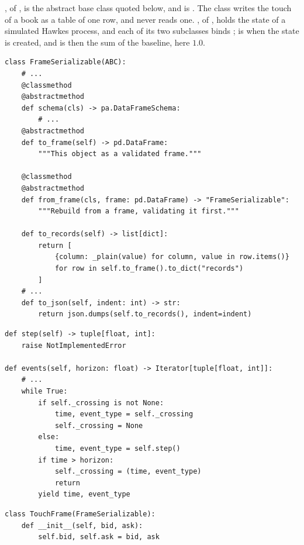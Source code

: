 \begin{question}
\label{question.abstractMethodRaisesAtInstantiation}
, of , is the abstract base class quoted below,
and  is .
The class  writes the touch of a book as a table of one row, and never reads one.
, of , holds the state of a simulated Hawkes process,
and each of its two subclasses binds ;
 is  when the state is created,
and  is then the sum of the baseline, here $1.0$.
\begin{lstlisting}[caption={\protect\codehl{unito26.lob.frames.FrameSerializable}, abridged: three declarations, and two forms derived from them.}, label=listing.abstractMethodRaisesAtInstantiationFrames]
class FrameSerializable(ABC):
    # ...
    @classmethod
    @abstractmethod
    def schema(cls) -> pa.DataFrameSchema:
        # ...
    @abstractmethod
    def to_frame(self) -> pd.DataFrame:
        """This object as a validated frame."""

    @classmethod
    @abstractmethod
    def from_frame(cls, frame: pd.DataFrame) -> "FrameSerializable":
        """Rebuild from a frame, validating it first."""

    def to_records(self) -> list[dict]:
        return [
            {column: _plain(value) for column, value in row.items()}
            for row in self.to_frame().to_dict("records")
        ]
    # ...
    def to_json(self, indent: int) -> str:
        return json.dumps(self.to_records(), indent=indent)
\end{lstlisting}
\begin{lstlisting}[caption={\protect\codehl{unito26.lob.hawkes.\_HawkesState}, abridged.}, label=listing.abstractMethodRaisesAtInstantiationState]
def step(self) -> tuple[float, int]:
    raise NotImplementedError

def events(self, horizon: float) -> Iterator[tuple[float, int]]:
    # ...
    while True:
        if self._crossing is not None:
            time, event_type = self._crossing
            self._crossing = None
        else:
            time, event_type = self.step()
        if time > horizon:
            self._crossing = (time, event_type)
            return
        yield time, event_type
\end{lstlisting}
\begin{lstlisting}[caption={The touch as a table}, label=listing.abstractMethodRaisesAtInstantiationTouch]
class TouchFrame(FrameSerializable):
    def __init__(self, bid, ask):
        self.bid, self.ask = bid, ask


\end{lstlisting}
\end{question}
